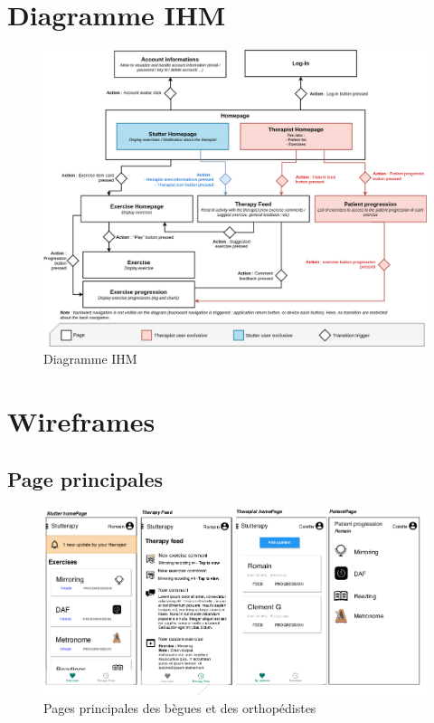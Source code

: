 \begin{appendices}
\chapter{Diagramme IHM}
\label{appendix:ihm}
\begin{figure}[H]
  \includegraphics[width=1\linewidth]{content/imgs/IHM_diagram.png}
  \caption*{Diagramme IHM}
\end{figure}


\chapter{Wireframes}
\label{appendix:wireframes}
\section{Page principales}
\begin{figure}[H]
  \includegraphics[width=1\linewidth]{content/imgs/maquette1.png}
  \caption*{Pages principales des bègues et des orthopédistes}
\end{figure}


\end{appendices}
